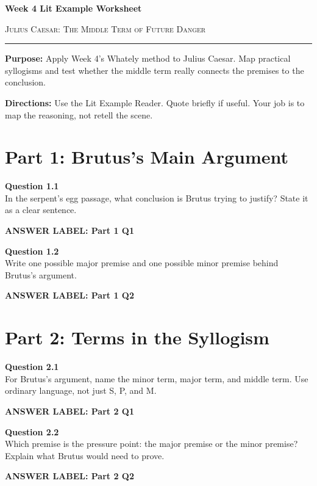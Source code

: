 \documentclass[12pt]{article}
\newcommand{\answerbox}[2]{%
\vspace{0.12em}
\noindent\textbf{#1}\par
\vspace{0.04em}
\noindent\fbox{%
\begin{minipage}[t][#2]{\dimexpr\textwidth-2\fboxsep-2\fboxrule}
\rule{\textwidth}{0pt}
\vspace{#2}
\end{minipage}}
\par\vspace{0.22em}}
\begin{document}
\begin{center}
{\LARGE\bfseries Week 4 Lit Example Worksheet}\par\vspace{0.05em}
{\large\scshape Julius Caesar: The Middle Term of Future Danger}\par\vspace{0.12em}
\rule{0.78\textwidth}{0.5pt}
\end{center}

\textbf{Purpose:} Apply Week 4's Whately method to Julius Caesar. Map practical syllogisms and test whether the middle term really connects the premises to the conclusion.

\textbf{Directions:} Use the Lit Example Reader. Quote briefly if useful. Your job is to map the reasoning, not retell the scene.

\section*{Part 1: Brutus's Main Argument}

\textbf{Question 1.1}\\[-0.15em]
In the serpent's egg passage, what conclusion is Brutus trying to justify? State it as a clear sentence.

\answerbox{ANSWER LABEL: Part 1 Q1}{2.0in}

\textbf{Question 1.2}\\[-0.15em]
Write one possible major premise and one possible minor premise behind Brutus's argument.

\answerbox{ANSWER LABEL: Part 1 Q2}{2.35in}

\newpage

\section*{Part 2: Terms in the Syllogism}

\textbf{Question 2.1}\\[-0.15em]
For Brutus's argument, name the minor term, major term, and middle term. Use ordinary language, not just S, P, and M.

\answerbox{ANSWER LABEL: Part 2 Q1}{2.35in}

\textbf{Question 2.2}\\[-0.15em]
Which premise is the pressure point: the major premise or the minor premise? Explain what Brutus would need to prove.

\answerbox{ANSWER LABEL: Part 2 Q2}{2.35in}
\end{document}
